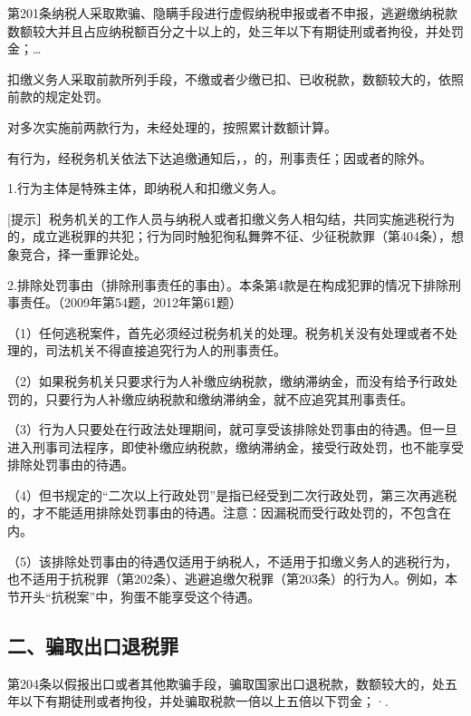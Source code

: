 第201条纳税人采取欺骗、隐瞒手段进行虚假纳税申报或者不申报，逃避缴纳税款数额较大并且占应纳税额百分之十以上的，处三年以下有期徒刑或者拘役，并处罚金；…

扣缴义务人采取前款所列手段，不缴或者少缴已扣、已收税款，数额较大的，依照前款的规定处罚。

对多次实施前两款行为，未经处理的，按照累计数额计算。

有行为，经税务机关依法下达追缴通知后，，的，刑事责任；因或者的除外。

1.行为主体是特殊主体，即纳税人和扣缴义务人。

[提示］税务机关的工作人员与纳税人或者扣缴义务人相勾结，共同实施逃税行为的，成立逃税罪的共犯；行为同时触犯徇私舞弊不征、少征税款罪（第404条），想象竞合，择一重罪论处。

2.排除处罚事由（排除刑事责任的事由）。本条第4款是在构成犯罪的情况下排除刑事责任。（2009年第54题，2012年第61题）

（1）任何逃税案件，首先必须经过税务机关的处理。税务机关没有处理或者不处理的，司法机关不得直接追究行为人的刑事责任。

（2）如果税务机关只要求行为人补缴应纳税款，缴纳滞纳金，而没有给予行政处罚的，只要行为人补缴应纳税款和缴纳滞纳金，就不应追究其刑事责任。

（3）行为人只要处在行政法处理期间，就可享受该排除处罚事由的待遇。但一旦进入刑事司法程序，即使补缴应纳税款，缴纳滞纳金，接受行政处罚，也不能享受排除处罚事由的待遇。

（4）但书规定的“二次以上行政处罚”是指已经受到二次行政处罚，第三次再逃税的，才不能适用排除处罚事由的待遇。注意：因漏税而受行政处罚的，不包含在内。

（5）该排除处罚事由的待遇仅适用于纳税人，不适用于扣缴义务人的逃税行为，也不适用于抗税罪（第202条）、逃避追缴欠税罪（第203条）的行为人。例如，本节开头“抗税案”中，狗蛋不能享受这个待遇。

\subsection*{二、骗取出口退税罪}

第204条以假报出口或者其他欺骗手段，骗取国家出口退税款，数额较大的，处五年以下有期徒刑或者拘役，并处骗取税款一倍以上五倍以下罚金；·.

